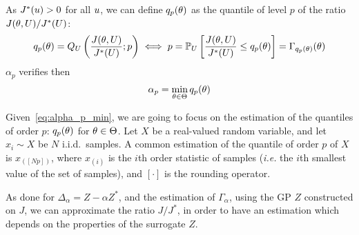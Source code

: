 \documentclass[../../Main_ManuscritThese.tex]{subfiles}
\begin{document}
As $J^*(u) > 0$ for all $u$, we can define $q_{p}(\theta)$ as the quantile of level $p$ of the ratio $J(\theta, U) / J^*(U)$:
\begin{align}
       q_{p}(\theta)= Q_{U}\left(\frac{J(\theta, U)}{J^*(U)};p\right) \iff  p  = \mathbb{P}_{U}\left[\frac{J(\theta, U)}{J^*(U)} \leq q_{p}(\theta)\right] = \Gamma_{q_p(\theta)}(\theta)
\end{align}
$\alpha_p$ verifies then
\begin{equation}
  \label{eq:alpha_p_min}
\alpha_p = \min_{\theta\in\Theta} q_p(\theta)
\end{equation}

Given~\cref{eq:alpha_p_min}, we are going to focus on the estimation of the quantiles of order $p$: $q_p(\theta)$ for $\theta \in \Theta$.
Let $X$ be a real-valued random variable, and let $x_i \sim X$ be $N$ i.i.d.\ samples.
A common estimation of the quantile of order $p$ of $X$ is  $x_{(\left[Np\right])}$, where $x_{(i)}$ is the $i$th order statistic of samples (\emph{i.e.} the $i$th smallest value of the set of samples), and $[\cdot]$ is the rounding operator.

As done for $\Delta_{\alpha} = Z - \alpha Z^*$, and the estimation of $\Gamma_{\alpha}$, using the GP $Z$ constructed on $J$, we can approximate the ratio $J/J^*$, in order to have an estimation which depends on the properties of the surrogate $Z$.
\end{document}
